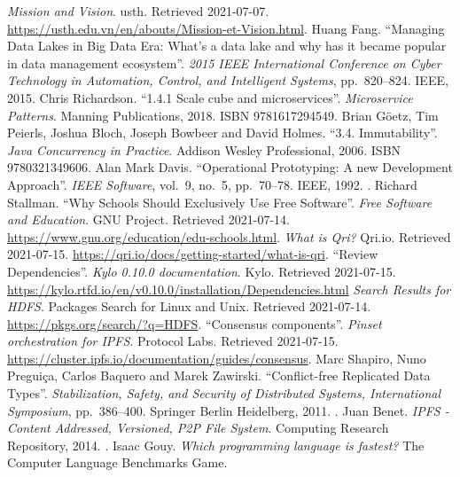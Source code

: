 \begin{thebibliography}{69}
   \emph{Mission and Vision}.
    \acrlong{usth}.  Retrieved 2021-07-07.
    \url{https://usth.edu.vn/en/abouts/Mission-et-Vision.html}.
   Huang Fang.
    ``Managing Data Lakes in Big Data Era: What's a data lake
    and why has it became popular in data management ecosystem''.
    \emph{2015 IEEE International Conference on Cyber Technology
    in Automation, Control, and Intelligent Systems}, pp.~820--824.
    IEEE, 2015.  
   Chris Richardson.
    ``1.4.1 Scale cube and microservices''.  \emph{Microservice Patterns}.
    Manning Publications, 2018.  ISBN 9781617294549.
   Brian Göetz, Tim Peierls, Joshua Bloch,
    Joseph Bowbeer and David Holmes.
    ``3.4. Immutability''.  \emph{Java Concurrency in Practice}.
    Addison Wesley Professional, 2006.  ISBN 9780321349606.
   Alan Mark Davis.
    ``Operational Prototyping: A new Development Approach''.
    \emph{IEEE Software}, vol.~9, no.~5, pp.~70--78.
    IEEE, 1992.  .
   Richard Stallman.
    ``Why Schools Should Exclusively Use Free Software''.
    \emph{Free Software and Education}.  GNU Project.  Retrieved 2021-07-14.
    \url{https://www.gnu.org/education/edu-schools.html}.
   \emph{What is Qri?} Qri.io.  Retrieved 2021-07-15.
    \url{https://qri.io/docs/getting-started/what-is-qri}.
   ``Review Dependencies''.  \emph{Kylo 0.10.0 documentation}.
    Kylo.  Retrieved 2021-07-15.
    \url{https://kylo.rtfd.io/en/v0.10.0/installation/Dependencies.html}
   \emph{Search Results for HDFS}.
    Packages Search for Linux and Unix.
    Retrieved 2021-07-14.  \url{https://pkgs.org/search/?q=HDFS}.
   ``Consensus components''.
    \emph{Pinset orchestration for IPFS}.
    Protocol Labs.  Retrieved 2021-07-15.
    \url{https://cluster.ipfs.io/documentation/guides/consensus}.
   Marc Shapiro, Nuno Preguiça, Carlos Baquero and Marek Zawirski.
    ``Conflict-free Replicated Data Types''.
    \emph{Stabilization, Safety, and Security of Distributed Systems,
     International Symposium}, pp.~386--400.
    Springer Berlin Heidelberg, 2011.  .
   Juan Benet.
    \emph{IPFS - Content Addressed, Versioned, P2P File System}.
    Computing Research Repository, 2014.  .
   Isaac Gouy.
    \emph{Which programming language is fastest?}
    The Computer Language Benchmarks Game.

\end{thebibliography}
